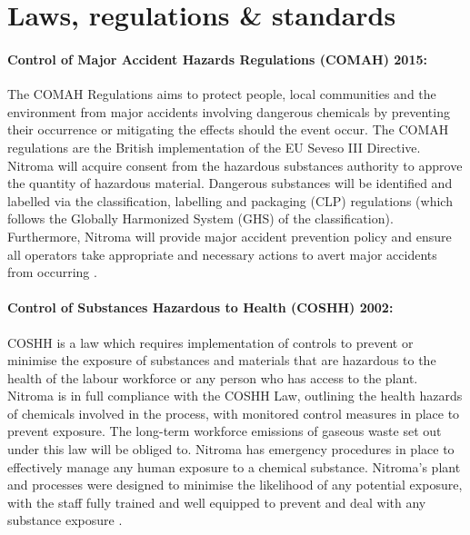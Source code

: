 \section{Laws, regulations \& standards}

\paragraph{Control of Major Accident Hazards Regulations (COMAH) 2015:} 

The COMAH Regulations aims to protect people, local communities and the environment from major accidents involving dangerous chemicals by preventing their occurrence or mitigating the effects should the event occur. The COMAH regulations are the British implementation of the EU Seveso III Directive. Nitroma will acquire consent from the hazardous substances authority to approve the quantity of hazardous material. Dangerous substances will be identified and labelled via the classification, labelling and packaging (CLP) regulations (which follows the Globally Harmonized System (GHS) of the classification). Furthermore, Nitroma will provide major accident prevention policy and ensure all operators take appropriate and necessary actions to avert major accidents from occurring \cite{health_and_safety_executive_understanding_2015}. 


\paragraph{Control of Substances Hazardous to Health (COSHH) 2002:}

COSHH is a law which requires implementation of controls to prevent or minimise the exposure of substances and materials that are hazardous to the health of the labour workforce or any person who has access to the plant. Nitroma is in full compliance with the COSHH Law, outlining the health hazards of chemicals involved in the process, with monitored control measures in place to prevent exposure. The long-term workforce emissions of gaseous waste set out under this law will be obliged to. Nitroma has emergency procedures in place to effectively manage any human exposure to a chemical substance. Nitroma’s plant and processes were designed to minimise the likelihood of any potential exposure, with the staff fully trained and well equipped to prevent and deal with any substance exposure \cite{health_and_safety_executive_control_nodate}. 

